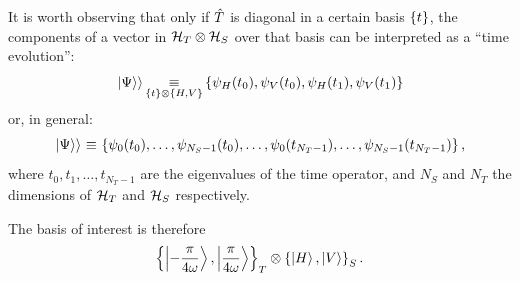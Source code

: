 It is worth observing that
only if $\hat{T}$ is diagonal in a certain basis $\qty{t}$,
the components of a vector in $\mathcal{H}_T \otimes \mathcal{H}_S$
over that basis
can be interpreted as a ``time evolution'':
\begin{equation}\label{eq:timepicks2}
  \left.\left| \Psi \right\rangle\right\rangle
  \operatorname*{\,\equiv\,}_{\qty{t} \otimes \qty{H,V}}
  \qty{\psi_H(t_0), \psi_V(t_0), \psi_H(t_1), \psi_V(t_1)}
\end{equation}
or, in general:
\begin{equation}\label{eq:timepicksN}
  \left.\left| \Psi \right\rangle\right\rangle
  \operatorname*{\,\equiv\,}
  \qty{
    \psi_0(t_0),
    \dotsc,
    \psi_{N_{S} - 1}(t_0),
    \dots,
    \psi_0(t_{N_{T}-1}),
    \dotsc,
    \psi_{N_{S} - 1}(t_{N_{T}-1})
  } \,\text{,}
\end{equation}
where
$t_0, t_1, \dots, t_{N_{T}-1}$ are the eigenvalues of the time operator,
and
$N_{S}$ and $N_{T}$ the dimensions of $\mathcal{H}_T$ and $\mathcal{H}_S$ respectively.

The basis of interest is therefore
\begin{equation}\label{eq:moreva:t_overall_basis}
  \qty{\ket{-\frac{\pi}{4\omega}}, \ket{\frac{\pi}{4\omega}}}_T \otimes \qty{\ket{H}, \ket{V}}_S
  \, \text{.}
\end{equation}

